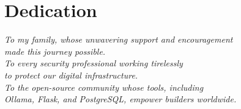 \chapter*{Dedication}
\thispagestyle{plain}
\vspace*{3cm}
\begin{center}
\itshape\large
To my family, whose unwavering support and encouragement\\
made this journey possible.\\[1em]
To every security professional working tirelessly\\
to protect our digital infrastructure.\\[1em]
To the open-source community whose tools, including\\
Ollama, Flask, and PostgreSQL, empower builders worldwide.
\end{center}
\cleardoublepage
